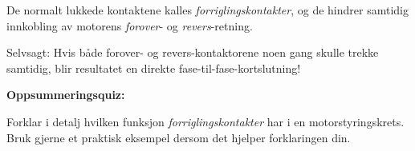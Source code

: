 De normalt lukkede kontaktene kalles {\it forriglingskontakter}, og de hindrer samtidig innkobling av motorens {\it forover}- og {\it revers}-retning.
 






Selvsagt: Hvis både forover- og revers-kontaktorene noen gang skulle trekke samtidig, blir resultatet en direkte fase-til-fase-kortslutning!







\vfil \eject

\noindent
{\bf Oppsummeringsquiz:}

Forklar i detalj hvilken funksjon {\it forriglingskontakter} har i en motorstyringskrets. Bruk gjerne et praktisk eksempel dersom det hjelper forklaringen din.



